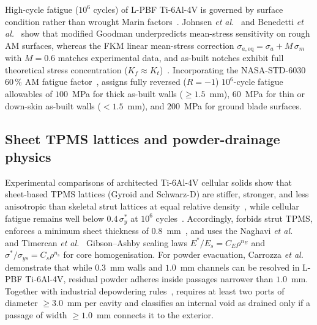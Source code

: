 High-cycle fatigue ($10^6$ cycles) of L-PBF Ti-6Al-4V is governed by surface condition rather than wrought Marin
factors~\cite{benedetti2018,nicoletto2018,wycisk2014,wycisk2015,pagliari2025}. Johnsen \emph{et al.}~\cite{johnsen2024} and
Benedetti \emph{et al.}~\cite{benedetti2018} show that modified Goodman underpredicts mean-stress sensitivity on rough AM
surfaces, whereas the FKM linear mean-stress correction $\sigma_{a,\mathrm{eq}} = \sigma_a + M\,\sigma_m$ with $M = 0.6$
matches experimental data, and as-built notches exhibit full theoretical stress concentration ($K_f \approx K_t$)~\cite{nicoletto2018,kahlin2017}.
Incorporating the NASA-STD-6030 $60\,\%$ AM fatigue factor~\cite{nasa6030},  assigns fully reversed
($R = -1$) $10^6$-cycle fatigue allowables of $100$~MPa for thick as-built walls ($\ge 1.5$~mm), $60$~MPa for thin or
down-skin as-built walls ($< 1.5$~mm), and $200$~MPa for ground blade surfaces.

\subsection{Sheet TPMS lattices and powder-drainage physics}
Experimental comparisons of architected Ti-6Al-4V cellular solids show that sheet-based TPMS lattices (Gyroid and Schwarz-D)
are stiffer, stronger, and less anisotropic than skeletal strut lattices at equal relative density~\cite{kelly2019,lietaert2018,naghavi2022,timercan2021},
while cellular fatigue remains well below $0.4\,\sigma_y^*$ at $10^6$ cycles~\cite{benedetti2021,alana2021}. Accordingly,
 forbids strut TPMS, enforces a minimum sheet thickness of $0.8$~mm~\cite{renishaw2017}, and uses the
Naghavi \emph{et al.}~\cite{naghavi2022} and Timercan \emph{et al.}~\cite{timercan2021} Gibson--Ashby scaling laws
$E^*/E_s = C_E \rho^{n_E}$ and $\sigma^*/\sigma_{ys} = C_s \rho^{n_s}$ for core homogenisation. For powder evacuation,
Carrozza \emph{et al.}~\cite{carrozza2023} demonstrate that while $0.3$~mm walls and $1.0$~mm channels can be resolved in
L-PBF Ti-6Al-4V, residual powder adheres inside passages narrower than $1.0$~mm. Together with industrial depowdering
rules~\cite{nasa6030,solukon},  requires at least two ports of diameter $\ge 3.0$~mm per cavity and
classifies an internal void as drained only if a passage of width $\ge 1.0$~mm connects it to the exterior.

